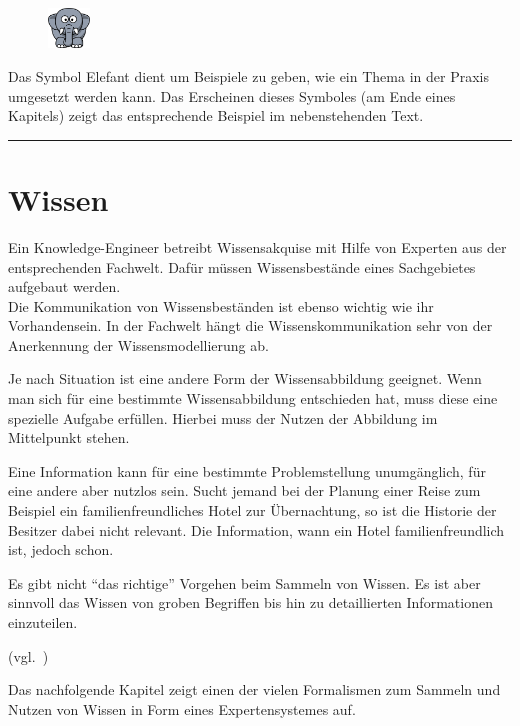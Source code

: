 \vspace{30pt}

\begin{figure}
    \vspace{-12pt}
    \includegraphics[width=0.1\textwidth]{bilder/elephant.png}\protect\footnotemark{}
\end{figure}
Das Symbol Elefant dient um Beispiele zu geben, wie ein Thema in der Praxis umgesetzt werden kann. Das Erscheinen dieses Symboles (am Ende eines Kapitels) zeigt das entsprechende Beispiel im nebenstehenden Text.\\

\noindent\rule[1ex]{\textwidth}{1pt}

\newpage

\section{Wissen}
\label{chap:einleitung_wissen}
Ein Knowledge-Engineer betreibt Wissensakquise mit Hilfe von Experten aus der entsprechenden Fachwelt. Dafür müssen Wissensbestände eines Sachgebietes aufgebaut werden. \\
Die Kommunikation von Wissensbeständen ist ebenso wichtig wie ihr Vorhandensein. In der Fachwelt hängt die Wissenskommunikation sehr von der Anerkennung der Wissensmodellierung ab.

Je nach Situation ist eine andere Form der Wissensabbildung geeignet. Wenn man sich für eine bestimmte Wissensabbildung entschieden hat, muss diese eine spezielle Aufgabe erfüllen. Hierbei muss der Nutzen der Abbildung im Mittelpunkt stehen.

Eine Information kann für eine bestimmte Problemstellung unumgänglich, für eine andere aber nutzlos sein. Sucht jemand bei der Planung einer Reise zum Beispiel ein familienfreundliches Hotel zur Übernachtung, so ist die Historie der Besitzer dabei nicht relevant. Die Information, wann ein Hotel familienfreundlich ist, jedoch schon.

Es gibt nicht ``das richtige'' Vorgehen beim Sammeln von Wissen. Es ist aber sinnvoll das Wissen von groben Begriffen bis hin zu detaillierten Informationen einzuteilen.

(vgl.~\cite[S. 287]{IspekOntoBedeutung})

Das nachfolgende Kapitel zeigt einen der vielen Formalismen zum Sammeln und Nutzen von Wissen in Form eines Expertensystemes auf.
